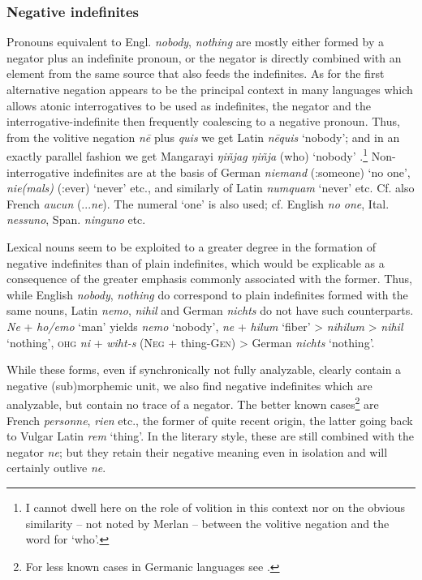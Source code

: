 \subsubsection{Negative indefinites} \label{sec:3.2.2.3}
Pronouns equivalent to Engl. \textit{nobody}, \textit{nothing} are mostly either formed by a negator plus an indefinite pronoun, or the negator is directly combined with an element from the same source that also feeds the indefinites. As for the first alternative negation appears to be the principal context in many languages which allows atonic interrogatives to be used as indefinites, the negator and the interrogative-indefinite then frequently coalescing to a negative pronoun. Thus, from the volitive negation \textit{n\=e} plus \textit{quis} we get Latin \textit{n\=equis} ‘nobody’; and in an exactly parallel fashion we get Mangarayi \textit{ŋiñjag ŋiñja} (\volneg who) ‘nobody’ \citep[36, 119]{Merlan1982}.\footnote{I cannot dwell here on the role of volition in this context nor on the obvious similarity -- not noted by Merlan -- between the volitive negation and the word for ‘who’.} Non-interrogative indefinites are at the basis of German \textit{niemand} (\glneg:someone) ‘no one’, \textit{nie(mals)} (\glneg:ever) ‘never’ etc., and similarly of Latin \textit{numquam} ‘never’ etc. Cf. also French \textit{aucun} (...\textit{ne}). The numeral ‘one’ is also used; cf. English \textit{no one}, Ital. \textit{nessuno}, Span. \textit{ninguno} etc.

Lexical nouns seem to be exploited to a greater degree in the formation of negative indefinites than of plain indefinites, which would be explicable as a consequence of the greater emphasis commonly associated with the former. Thus, while English \textit{nobody}, \textit{nothing} do correspond to plain indefinites formed with the same nouns, Latin \textit{nemo}, \textit{nihil} and German \textit{nichts} do not have such counterparts. \textit{Ne} + \textit{ho/emo} ‘man’ yields \textit{nemo} ‘nobody’, \textit{ne} + \textit{hilum} ‘fiber’ {\textgreater} \textit{nihilum} {\textgreater} \textit{nihil} ‘nothing’, \textsc{ohg} \textit{ni} + \textit{wiht-s} (\textsc{Neg} + thing-\textsc{Gen}) {\textgreater} German \textit{nichts} ‘nothing’.

While these forms, even if synchronically not fully analyzable, clearly contain a negative (sub)morphemic unit, we also find negative indefinites which are analyzable, but contain no trace of a negator. The better known cases\footnote{For less known cases in Germanic languages see \citealt[73]{Krahe1967}.} are French \textit{personne}, \textit{rien} etc., the former of quite recent origin, the latter going back to Vulgar Latin \textit{rem} ‘thing’. In the literary style, these are still combined with the negator \textit{ne}; but they retain their negative meaning even in isolation and will certainly outlive \textit{ne}.

